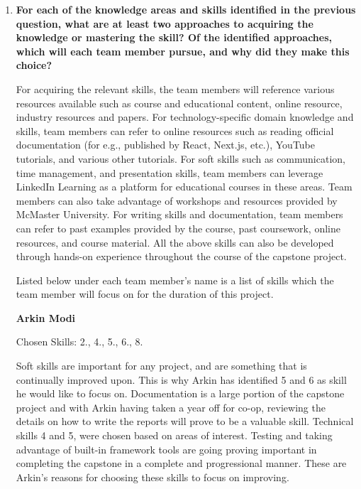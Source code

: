 \documentclass[12pt]{article}
\begin{document}
\begin{enumerate}
	\item \textbf{For each of the knowledge areas and skills identified in the previous question, what are at least
		      two approaches to acquiring the knowledge or mastering the skill? Of the identified approaches,
		      which will each team member pursue, and why did they make this choice?}

	      For acquiring the relevant skills, the team members will reference various resources available such
	      as course and educational content, online resource, industry resources and papers. For
	      technology-specific domain knowledge and skills, team members can refer to online resources such as
	      reading official documentation (for e.g., published by React, Next.js, etc.), YouTube tutorials,
	      and various other tutorials. For soft skills such as communication, time management, and
	      presentation skills, team members can leverage LinkedIn Learning as a platform for educational
	      courses in these areas. Team members can also take advantage of workshops and resources provided by
	      McMaster University. For writing skills and documentation, team members can refer to past examples
	      provided by the course, past coursework, online resources, and course material. All the above
	      skills can also be developed through hands-on experience throughout the course of the capstone
	      project.

	      Listed below under each team member's name is a list of skills which the team member will focus on
	      for the duration of this project.

	      \textbf{Arkin Modi}

	      Chosen Skills: 2., 4., 5., 6., 8.

	      Soft skills are important for any project, and are something that is continually improved upon.
	      This is why Arkin has identified 5 and 6 as skill he would like to focus on. Documentation is a
	      large portion of the capstone project and with Arkin having taken a year off for co-op, reviewing
	      the details on how to write the reports will prove to be a valuable skill. Technical skills 4 and
	      5, were chosen based on areas of interest. Testing and taking advantage of built-in framework tools
	      are going proving important in completing the capstone in a complete and progressional manner.
	      These are Arkin's reasons for choosing these skills to focus on improving.


\end{enumerate}
\end{document}
